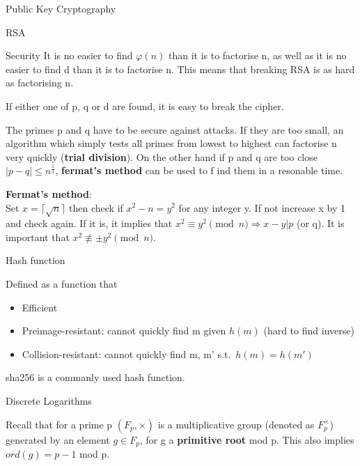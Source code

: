 \documentclass[12pt, letterpaper]{article}
\begin{document}
\begin{section}{Public Key Cryptography}
\begin{subsection}{RSA}
\begin{subsubsection}{Security}
      It is no easier to find \(\varphi(n)\) than it is to factorise n, as well
      as it is no easier to find d than it is to factorise n. This means that
      breaking RSA is as hard as factorising n.

      If either one of p, q or d are found, it is easy to break the cipher.

      The primes p and q have to be secure against attacks. If they are too
      small, an algorithm which simply tests all primes from lowest to highest
      can factorise n very quickly (\textbf{trial division}). On the other hand
      if p and q are too close \(|p - q| \leq n^{\frac{1}{4}}\),
      \textbf{fermat's method} can be used to f ind them in a resonable time.

      \textbf{Fermat's method}: \\
      Set \(x = \lceil \sqrt{n} \rceil\) then check if \(x^{2} - n = y^{2}\)
      for any integer y. If not increase x by 1 and check again. If it is,
      it implies that \(x^{2} \equiv y^{2} \pmod{n} \Rightarrow x - y | p\)
      (or q). It is important that \(x^{2} \not\equiv \pm y^{2} \pmod{n}\).

    \end{subsubsection}

  \end{subsection}

  \begin{subsection}{Hash function}

    Defined as a function that
    \begin{itemize}
      \item Efficient
      \item Preimage-resistant: cannot quickly find m given \(h(m)\)
            (hard to find inverse)
      \item Collision-resistant: cannot quickly find m, m' s.t.\
            \(h(m) = h(m')\)
    \end{itemize}

    sha256 is a commanly used hash function.

  \end{subsection}

  \begin{subsection}{Discrete Logarithms}

    Recall that for a prime p \((F_{p}, \times)\) is a multiplicative group
    (denoted as \(F_{p}^{\times}\)) generated by an element \(g \in F_{p}\),
    for g a \textbf{primitive root} mod p. This also implies \(ord(g) = p - 1\)
    mod p.


\end{subsection}
\end{section}
\end{document}
